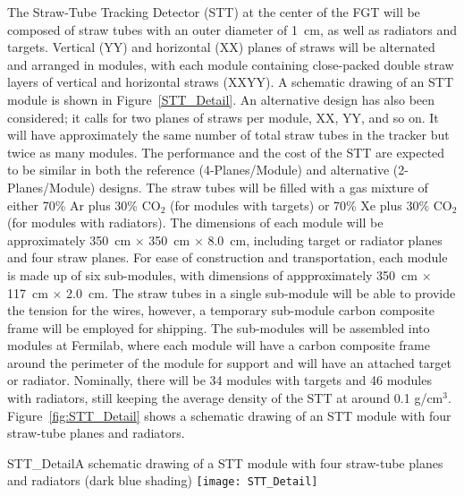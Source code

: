 The Straw-Tube Tracking Detector (STT) %
at the center of the FGT %
will be composed of straw tubes with an outer diameter of 1~cm, as well as 
radiators and targets.  
Vertical (YY) and horizontal (XX) planes of straws  will be alternated and 
arranged in modules, with each module containing close-packed double straw layers 
of vertical and horizontal straws (XXYY).  A schematic drawing of an STT module is shown in 
Figure~\ref{STT_Detail}. 
An alternative design has also been considered; it calls for two planes of straws
per module, XX, YY, and so on. It will have approximately the same number of
total straw tubes in the tracker but twice as many modules. 
The performance and the cost of the STT are expected to be similar 
in both the reference (4-Planes/Module) and alternative (2-Planes/Module) designs.
 The straw tubes will be filled with a
gas mixture of either 70\% Ar plus 30\% CO$_2$ (for modules with targets) or
70\% Xe plus 30\% CO$_2$ (for modules with radiators). 
The dimensions of each module  will
be approximately 350~cm $\times$ 350~cm $\times$ 8.0~cm, including 
target or radiator planes and four straw planes. For ease of construction and
transportation, each module is made up of six sub-modules, with dimensions of
appproximately 350~cm $\times$ 117~cm $\times$ 2.0~cm. 
The straw tubes in a single sub-module will be able to provide the tension 
for the wires, however, a temporary sub-module carbon composite frame will 
be employed for shipping. The sub-modules will be assembled %
into modules 
at Fermilab, where each module will have a carbon composite frame around 
the perimeter of the module for support  and will have an attached target or 
radiator. Nominally, there will be 34 modules with targets and 46 modules 
with radiators, still keeping the 
average density of the STT at around 0.1 g/cm$^3$. Figure~\ref{fig:STT_Detail}
shows a schematic drawing of an STT module with four straw-tube planes and
radiators.


\begin{cdrfigure}{STT_Detail}{A schematic drawing of a STT module with four straw-tube planes and
radiators (dark blue shading)}
\texttt{[image: STT\_Detail]}
\end{cdrfigure}

